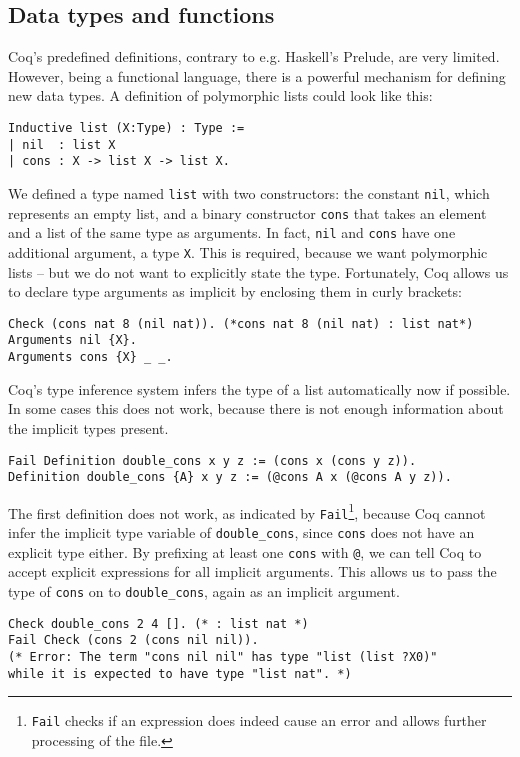 \documentclass[fleqn]{scrreprt}
\newcommand{\coqinline}[1]{\texttt{#1}}
\begin{document}
\subsection{Data types and functions}
Coq's predefined definitions, contrary to e.g. Haskell's Prelude, are very limited. However, being a functional language, there is a powerful mechanism for defining new data types. A definition of polymorphic lists could look like this:
\begin{verbatim}
Inductive list (X:Type) : Type :=
| nil  : list X
| cons : X -> list X -> list X.
\end{verbatim}
We defined a type named \coqinline{list} with two constructors: the constant \coqinline{nil}, which represents an empty list, and a binary constructor \coqinline{cons} that takes an element and a list of the same type as arguments. In fact, \coqinline{nil} and \coqinline{cons} have one additional argument, a type \coqinline{X}. This is required, because we want polymorphic lists -- but we do not want to explicitly state the type. Fortunately, Coq allows us to declare type arguments as implicit by enclosing them in curly brackets:
\begin{verbatim}
Check (cons nat 8 (nil nat)). (*cons nat 8 (nil nat) : list nat*)
Arguments nil {X}.
Arguments cons {X} _ _.
\end{verbatim}
Coq's type inference system infers the type of a list automatically now if possible. In some cases this does not work, because there is not enough information about the implicit types present. 
\begin{verbatim}
Fail Definition double_cons x y z := (cons x (cons y z)).
Definition double_cons {A} x y z := (@cons A x (@cons A y z)).
\end{verbatim}
The first definition does not work, as indicated by \coqinline{Fail}\footnote{\coqinline{Fail} checks if an expression does indeed cause an error and allows further processing of the file.}, because Coq cannot infer the implicit type variable of \coqinline{double_cons}, since \coqinline{cons} does not have an explicit type either. By prefixing at least one \coqinline{cons} with \coqinline{@}, we can tell Coq to accept explicit expressions for all implicit arguments. This allows us to pass the type of \coqinline{cons} on to \coqinline{double_cons}, again as an implicit argument.
\begin{verbatim}
Check double_cons 2 4 []. (* : list nat *)
Fail Check (cons 2 (cons nil nil)). 
(* Error: The term "cons nil nil" has type "list (list ?X0)"
while it is expected to have type "list nat". *)
\end{verbatim}
\end{document}
